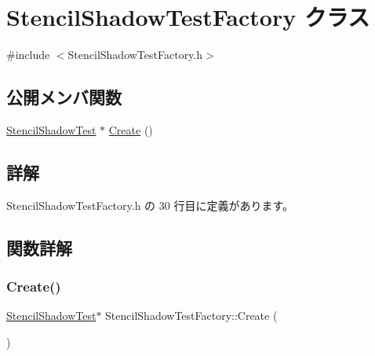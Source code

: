 \hypertarget{class_stencil_shadow_test_factory}{}\section{Stencil\+Shadow\+Test\+Factory クラス}
\label{class_stencil_shadow_test_factory}


{\ttfamily \#include $<$Stencil\+Shadow\+Test\+Factory.\+h$>$}

\subsection*{公開メンバ関数}
\begin{DoxyCompactItemize}
\item 
\mbox{\hyperlink{class_stencil_shadow_test}{Stencil\+Shadow\+Test}} $\ast$ \mbox{\hyperlink{class_stencil_shadow_test_factory_a4eec5b125ff810267c784c8a922909a2}{Create}} ()
\end{DoxyCompactItemize}


\subsection{詳解}


 Stencil\+Shadow\+Test\+Factory.\+h の 30 行目に定義があります。



\subsection{関数詳解}
\mbox{\label{class_stencil_shadow_test_factory_a4eec5b125ff810267c784c8a922909a2}} 
\subsubsection{\texorpdfstring{Create()}{Create()}}
{\footnotesize\ttfamily \mbox{\hyperlink{class_stencil_shadow_test}{Stencil\+Shadow\+Test}}$\ast$ Stencil\+Shadow\+Test\+Factory\+::\+Create (\begin{DoxyParamCaption}{ }\end{DoxyParamCaption})\hspace{0.3cm}{\ttfamily [inline]}}



